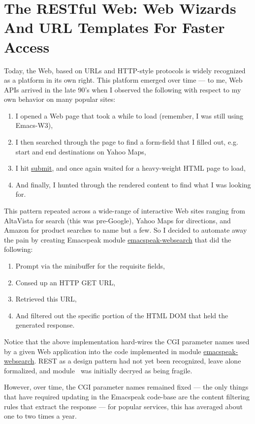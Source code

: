 \documentclass[11pt]{article}
\begin{document}
\section{The RESTful Web:  Web Wizards And URL Templates For Faster Access}
\label{sec-14}

Today, the Web, based on URLs and HTTP-style protocols is widely
recognized as a platform in its own right. This platform emerged
over time — to me, Web APIs arrived in the late 90's when I
observed the following with respect  to my own behavior  on many
popular sites:

\begin{enumerate}
\item I opened a Web page that took a while to load (remember,  I
was still using Emacs-W3),
\item I then searched through the page to find a form-field that
I filled out, e.g. start and end destinations on Yahoo Maps,
\item I hit \uline{submit}, and once again waited for a heavy-weight
HTML page to load,
\item And finally, I hunted through the rendered content to find
what I was looking for.
\end{enumerate}

This pattern repeated across a wide-range of interactive Web
sites ranging from AltaVista for search (this was pre-Google), Yahoo Maps for directions, and Amazon for product searches
to name but a few. So I decided to automate away the pain by
creating Emacspeak module \uline{emacspeak-websearch}
that  did the following: 

\begin{enumerate}
\item Prompt via the minibuffer for the requisite fields,
\item Consed up an HTTP GET URL,
\item Retrieved this URL,
\item And filtered out the specific portion of the HTML  DOM that
held the  generated response.
\end{enumerate}

Notice that the above implementation hard-wires the CGI parameter
names used by a given Web application into the code implemented
in module \uline{emacspeak-websearch}.  REST as a design pattern had
not yet been recognized, leave alone formalized, and module
$_{\text{ }}$was initially decryed as being fragile.

However, over time, the CGI parameter names remained fixed — the
 only things that have required updating in the Emacspeak
 code-base are the content filtering rules that extract the
 response — for popular services, this has averaged about one to
 two times a year.
\end{document}
